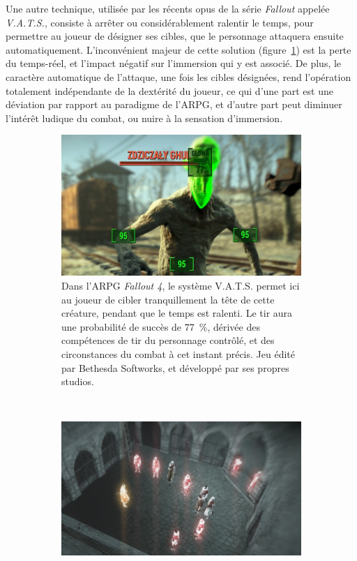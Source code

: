 	Une autre technique, utilisée par les récents opus de la série \emph{Fallout} appelée \emph{V.A.T.S.}, consiste à arrêter ou considérablement ralentir le temps, pour permettre au joueur de désigner ses cibles, que le personnage attaquera ensuite automatiquement. L'inconvénient majeur de cette solution (figure~\ref{fig:f4vats}) est la perte du temps-réel, et l'impact négatif sur l'immersion qui y est associé. De plus, le caractère automatique de l'attaque, une fois les cibles désignées, rend l'opération totalement indépendante de la dextérité du joueur, ce qui d'une part est une déviation par rapport au paradigme de l'ARPG, et d'autre part peut diminuer l'intérêt ludique du combat, ou nuire à la sensation d'immersion.
	
	\begin{figure}[!htbp]
		\begin{subfigure}[t]{0.48\textwidth}
			\centering
			\includegraphics[width=\textwidth]{figures/ch1/f4vats}
			\caption[Système V.A.T.S permettant de faciliter les tirs dans \emph{Fallout 4}]{Dans l'ARPG \emph{Fallout 4}, le système V.A.T.S. permet ici au joueur de cibler tranquillement la tête de cette créature, pendant que le temps est ralenti. Le tir aura une probabilité de succès de 77~\%{}, dérivée des compétences de tir du personnage contrôlé, et des circonstances du combat à cet instant précis. Jeu édité par Bethesda Softworks, et développé par ses propres studios.}
			\label{fig:f4vats}
		\end{subfigure}
		~
		\begin{subfigure}[t]{0.50\textwidth}
			\centering
			\includegraphics[width=\textwidth]{figures/ch1/assassin}

\end{subfigure}
\end{figure}
